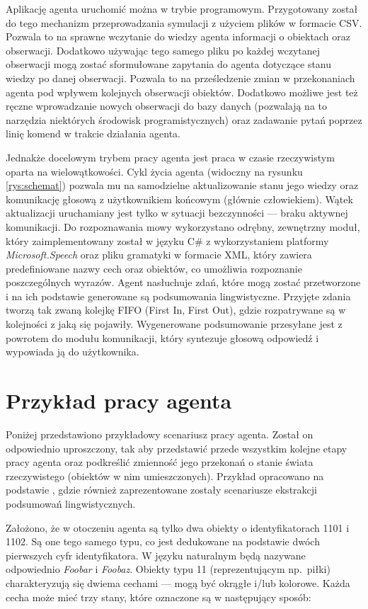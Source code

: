 Aplikację agenta uruchomić można w trybie programowym. Przygotowany został do tego mechanizm przeprowadzania symulacji z użyciem plików w formacie CSV. Pozwala to na sprawne wczytanie do wiedzy agenta informacji o obiektach oraz obserwacji. Dodatkowo używając tego samego pliku po każdej wczytanej obserwacji mogą zostać sformułowane zapytania do agenta dotyczące stanu wiedzy po danej obserwacji. Pozwala to na prześledzenie zmian w przekonaniach agenta pod wpływem kolejnych obserwacji obiektów. Dodatkowo możliwe jest też ręczne wprowadzanie nowych obserwacji do bazy danych (pozwalają na to narzędzia niektórych środowisk programistycznych) oraz zadawanie pytań poprzez linię komend w trakcie działania agenta. 

Jednakże docelowym trybem pracy agenta jest praca w czasie rzeczywistym oparta na wielowątkowości. Cykl życia agenta (widoczny na rysunku \ref{rys:schemat}) pozwala mu na samodzielne aktualizowanie stanu jego wiedzy oraz komunikację głosową z użytkownikiem końcowym (głównie człowiekiem). Wątek aktualizacji uruchamiany jest tylko w sytuacji bezczynności --- braku aktywnej komunikacji. Do rozpoznawania mowy wykorzystano odrębny, zewnętrzny moduł, który zaimplementowany został w języku C\# z wykorzystaniem platformy \textit{Microsoft.Speech} oraz pliku gramatyki w formacie XML, który zawiera predefiniowane nazwy cech oraz obiektów, co umożliwia rozpoznanie poszczególnych wyrazów. Agent nasłuchuje zdań, które mogą zostać przetworzone i na ich podstawie generowane są podsumowania lingwistyczne. Przyjęte zdania tworzą tak zwaną kolejkę FIFO (First In, First Out), gdzie rozpatrywane są w kolejności z jaką się pojawiły. Wygenerowane podsumowanie przesyłane jest z powrotem do modułu komunikacji, który syntezuje głosową odpowiedź i wypowiada ją do użytkownika.


\section{Przykład pracy agenta}

Poniżej przedstawiono przykładowy scenariusz pracy agenta. Został on odpowiednio uproszczony, tak aby przedstawić przede wszystkim kolejne etapy pracy agenta oraz podkreślić zmienność jego przekonań o stanie świata rzeczywistego (obiektów w nim umieszczonych). Przykład opracowano na podstawie \cite{kat17}, gdzie również zaprezentowane zostały scenariusze ekstrakcji podsumowań lingwistycznych.

Założono, że w otoczeniu agenta są tylko dwa obiekty o identyfikatorach 1101 i 1102. Są one tego samego typu, co jest dedukowane na podstawie dwóch pierwszych cyfr identyfikatora. W języku naturalnym będą nazywane odpowiednio \textit{Foobar} i \textit{Foobaz}. Obiekty typu 11 (reprezentującym np.\ piłki) charakteryzują się dwiema cechami --- mogą być okrągłe i/lub kolorowe. Każda cecha może mieć trzy stany, które oznaczone są w następujący sposób:

